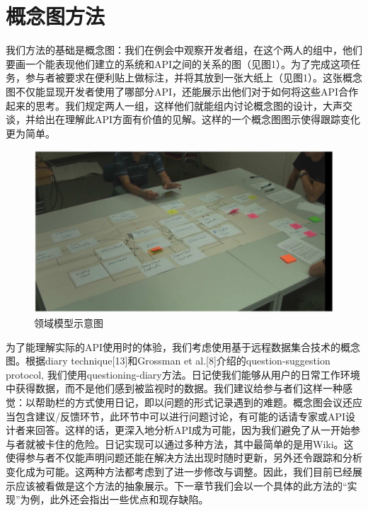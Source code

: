 \section*{概念图方法}
我们方法的基础是概念图：我们在例会中观察开发者组，在这个两人的组中，他们要画一个能表现他们建立的系统和API之间的关系的图（见图1）。为了完成这项任务，参与者被要求在便利贴上做标注，并将其放到一张大纸上（见图1）。这张概念图不仅能显现开发者使用了哪部分API，还能展示出他们对于如何将这些API合作起来的思考。我们规定两人一组，这样他们就能组内讨论概念图的设计，大声交谈，并给出在理解此API方面有价值的见解。这样的一个概念图图示使得跟踪变化更为简单。
\begin{figure}[!hbp]
  \begin{center}
    \includegraphics[scale=0.3]{figures/translation/translation_api_fig1.png}
    领域模型示意图
  \end{center}
\end{figure}

为了能理解实际的API使用时的体验，我们考虑使用基于远程数据集合技术的概念图。根据diary technique[13]和Grossman et al.[8]介绍的question-suggestion protocol, 我们使用questioning-diary方法。日记使我们能够从用户的日常工作环境中获得数据，而不是他们感到被监视时的数据。我们建议给参与者们这样一种感觉：以帮助栏的方式使用日记，即以问题的形式记录遇到的难题。概念图会议还应当包含建议/反馈环节，此环节中可以进行问题讨论，有可能的话请专家或API设计者来回答。这样的话，更深入地分析API成为可能，因为我们避免了从一开始参与者就被卡住的危险。日记实现可以通过多种方法，其中最简单的是用Wiki。这使得参与者不仅能声明问题还能在解决方法出现时随时更新，另外还令跟踪和分析变化成为可能。这两种方法都考虑到了进一步修改与调整。因此，我们目前已经展示应该被看做是这个方法的抽象展示。下一章节我们会以一个具体的此方法的“实现”为例，此外还会指出一些优点和现存缺陷。
